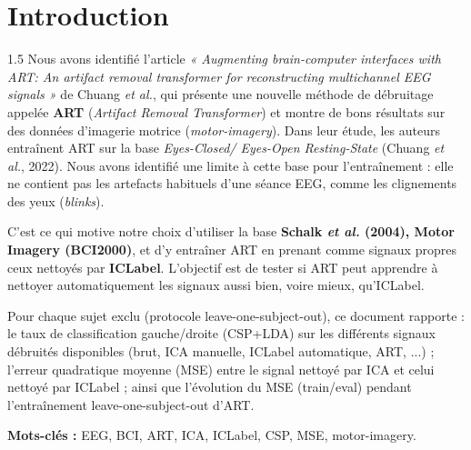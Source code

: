 \documentclass[11pt,a4paper]{article}
\begin{document}
\section*{Introduction}
\begin{spacing}{1.5}
\noindent
Nous avons identifié l'article \textit{« Augmenting brain-computer interfaces with
ART: An artifact removal transformer for reconstructing multichannel EEG
signals »} de Chuang \textit{et al.}, qui présente une nouvelle méthode de
débruitage appelée \textbf{ART} (\textit{Artifact Removal Transformer}) et montre
de bons résultats sur des données d'imagerie motrice (\textit{motor-imagery}).
Dans leur étude, les auteurs entraînent ART sur la base \textit{Eyes-Closed/
Eyes-Open Resting-State} (Chuang \textit{et al.}, 2022). Nous avons identifié une
limite à cette base pour l'entraînement : elle ne contient pas les artefacts
habituels d'une séance EEG, comme les clignements des yeux (\textit{blinks}).

\vspace{0.5em}
C'est ce qui motive notre choix d'utiliser la base \textbf{Schalk \textit{et al.}
(2004), Motor Imagery (BCI2000)}, et d'y entraîner ART en prenant comme signaux
propres ceux nettoyés par \textbf{ICLabel}. L'objectif est de tester si ART peut
apprendre à nettoyer automatiquement les signaux aussi bien, voire mieux,
qu'ICLabel.

\vspace{0.5em}
\noindent
Pour chaque sujet exclu (protocole leave-one-subject-out), ce document rapporte :
le taux de classification gauche/droite (CSP+LDA) sur les différents signaux
débruités disponibles (brut, ICA manuelle, ICLabel automatique, ART, ...) ;
l'erreur quadratique moyenne (MSE) entre le signal nettoyé par ICA et celui
nettoyé par ICLabel ; ainsi que l'évolution du MSE (train/eval) pendant
l'entraînement leave-one-subject-out d'ART.

\vspace{0.5em}
\noindent\textbf{Mots-clés :} EEG, BCI, ART, ICA, ICLabel, CSP, MSE, motor-imagery.
\end{spacing}

\clearpage
\tableofcontents

\clearpage
\end{document}
